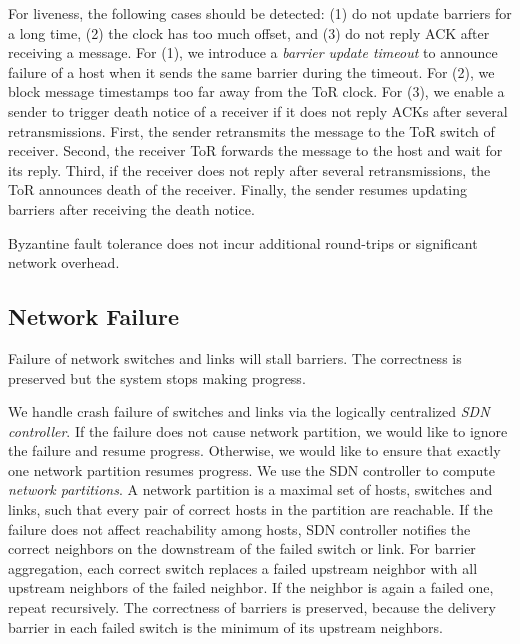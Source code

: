 {For liveness, the following cases should be detected: (1) do not update barriers for a long time, (2) the clock has too much offset, and (3) do not reply ACK after receiving a message.
For (1), we introduce a \emph{barrier update timeout} to announce failure of a host when it sends the same barrier during the timeout. %
For (2), we block message timestamps too far away from the ToR clock.
For (3), we enable a sender to trigger death notice of a receiver if it does not reply ACKs after several retransmissions.
First, the sender retransmits the message to the ToR switch of receiver.
Second, the receiver ToR forwards the message to the host and wait for its reply.
Third, if the receiver does not reply after several retransmissions, the ToR announces death of the receiver.
Finally, the sender resumes updating barriers after receiving the death notice.

Byzantine fault tolerance does not incur additional round-trips or significant network overhead.



\subsection{Network Failure}
\label{sec:network-failure}

Failure of network switches and links will stall barriers.
The correctness is preserved but the system stops making progress.

We handle crash failure of switches and links via the logically centralized \emph{SDN controller}.
If the failure does not cause network partition, we would like to ignore the failure and resume progress.
Otherwise, we would like to ensure that exactly one network partition resumes progress.
We use the SDN controller to compute \emph{network partitions}.
A network partition is a maximal set of hosts, switches and links, such that every pair of correct hosts in the partition are reachable.
If the failure does not affect reachability among hosts, SDN controller notifies the correct neighbors on the downstream of the failed switch or link.
For barrier aggregation, each correct switch replaces a failed upstream neighbor with all upstream neighbors of the failed neighbor.
If the neighbor is again a failed one, repeat recursively.
The correctness of barriers is preserved, because the delivery barrier in each failed switch is the minimum of its upstream neighbors. %

}
